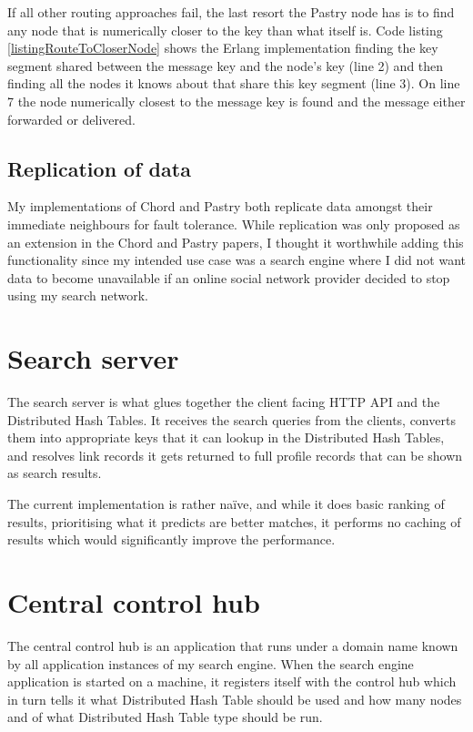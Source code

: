 If all other routing approaches fail, the last resort the Pastry node has is to find any node that is numerically closer to the key than what itself is. Code listing \ref{listingRouteToCloserNode} shows the Erlang implementation finding the key segment shared between the message key and the node's key (line 2) and then finding all the nodes it knows about that share this key segment (line 3). On line 7 the node numerically closest to the message key is found and the message either forwarded or delivered.



\subsection{Replication of data}
My implementations of Chord and Pastry both replicate data amongst their immediate neighbours for fault tolerance. While replication was only proposed as an extension in the Chord \cite{chord} and Pastry \cite{pastry} papers, I thought it worthwhile adding this functionality since my intended use case was a search engine where I did not want data to become unavailable if an online social network provider decided to stop using my search network.

\section{Search server}
The search server is what glues together the client facing HTTP API and the Distributed Hash Tables. It receives the search queries from the clients, converts them into appropriate keys that it can lookup in the Distributed Hash Tables, and resolves link records it gets returned to full profile records that can be shown as search results.

The current implementation is rather na\"ive, and while it does basic ranking of results, prioritising what it predicts are better matches, it performs no caching of results which would significantly improve the performance.

\section{Central control hub}
The central control hub is an application that runs under a domain name known by all application instances of my search engine.
When the search engine application is started on a machine, it registers itself with the control hub which in turn tells it what Distributed Hash Table should be used and how many nodes and of what Distributed Hash Table type should be run.

